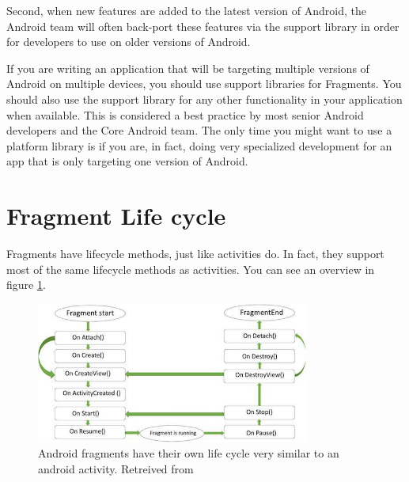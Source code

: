 Second, when new features are added to the latest version of Android, the Android team will often back-port these features via the support library in order for developers to use on older versions of Android.

\begin{framed}
If you are writing an application that will be targeting multiple versions of Android on multiple devices, you should use support libraries for Fragments. You should also use the support library for any other functionality in your application when available. This is considered a best practice by most senior Android developers and the Core Android team. The only time you might want to use a platform library is if you are, in fact, doing very specialized development for an app that is only targeting one version of Android.
\end{framed}

\section{Fragment Life cycle}
Fragments have lifecycle methods, just like activities do. In fact, they support most
of the same lifecycle methods as activities. You can see an overview in figure \ref{fig:fraglifecycle}.


\begin{figure}
	\centering
	\includegraphics[width=0.8\textwidth]{images/fragments/lifecycle.jpg}
	\caption{Android fragments have their own life cycle very similar to an android activity. Retreived from \cite{Point2017}}
	\label{fig:fraglifecycle}
\end{figure}


